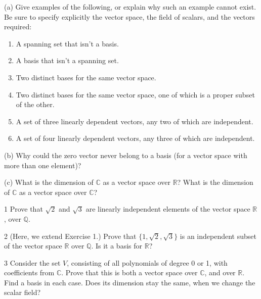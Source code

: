 \begin{problem}[Warmup]{(a)}
    Give examples of the following, or explain why such an example cannot exist. Be sure to specify explicitly the vector space, the field of scalars, and the vectors required:
    \begin{enumerate}
        \item[(a)] A spanning set that isn't a basis.
        \item[(b)] A basis that isn't a spanning set.
        \item[(c)] Two distinct bases for the same vector space.
        \item[(d)] Two distinct bases for the same vector space, one of which is a proper subset of the other.
        \item[(e)] A set of three linearly dependent vectors, any two of which are independent.
        \item[(f)] A set of four linearly dependent vectors, any three of which are independent.
    \end{enumerate}
\end{problem}
\unsolved

\begin{problem}[Warmup]{(b)}
    Why could the zero vector never belong to a basis (for a vector space with more than one element)?
\end{problem}
\unsolved

\begin{problem}[Warmup]{(c)}
    What is the dimension of $\mathbb{C}$ as a vector space over $\mathbb{R}$? What is the dimension of $\mathbb{C}$ as a vector space over $\mathbb{C}$?
\end{problem}
\unsolved

\begin{problem}{1}
    Prove that $\sqrt{2}$ and $\sqrt{3}$ are linearly independent elements of the vector
    space $\mathbb{R}$, over $\mathbb{Q}$.
\end{problem}
\unsolved

\begin{problem}{2}
    (Here, we extend Exercise 1.) Prove that $\{1, \sqrt{2}, \sqrt{3}\}$ is an independent
    subset of the vector space $\mathbb{R}$ over $\mathbb{Q}$. Is it a basis for
    $\mathbb{R}$?
\end{problem}
\unsolved

\begin{problem}{3}
    Consider the set $V$, consisting of all polynomials of degree 0 or 1, with coefficients
    from $\mathbb{C}$. Prove that this is both a vector space over $\mathbb{C}$, and over
    $\mathbb{R}$. Find a basis in each case. Does its dimension stay the same, when we
    change the scalar field?
\end{problem}
\unsolved

